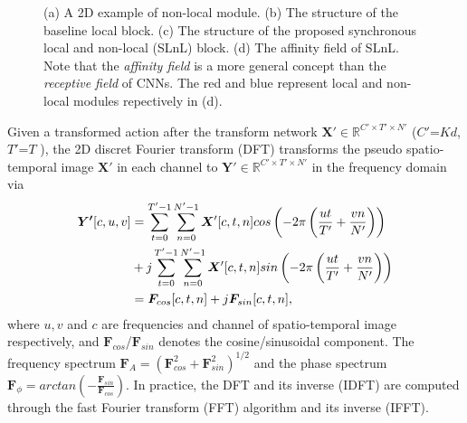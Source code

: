 \documentclass{article}
\begin{document}
\begin{figure*}[htb]
	\centering
	\caption{(a) A 2D  example of non-local module. (b) The structure of the baseline local block. (c) The structure of the proposed synchronous local and non-local (SLnL) block. (d) The affinity field of SLnL. Note that the \textit{affinity field} is a more general concept than the \textit{receptive field} of CNNs. The red and blue represent local and non-local modules repectively in (d).}
	\label{Fig3}
\end{figure*}

Given a transformed action after the transform network {\myfont$\bm{X'}\in \mathbb{R}^{C' \times T' \times N'} $} ({\myfont $C'$=$Kd$}, $T'$=$T$ ), the 2D discret Fourier transform (DFT) transforms the pseudo spatio-temporal image {\myfont$\bm{X'}$} in each channel to
{\myfont$\bm{Y'} \in \mathbb{R}^{C' \times T' \times N'} $} in the
frequency domain via
{\myfont
	\begin{align}
	\bm{Y'}[c,u,v]
& = \sum_{t=0}^{T'-1}\sum_{n=0}^{N'-1} \bm{X}'[c,t,n]cos\left(-2\pi\left(\frac{ut}{T'}+ \frac{vn}{N'}\right)\right) \notag\\
	& + j\sum_{t=0}^{T'-1}\sum_{n=0}^{N'-1} \bm{X}'[c,t,n]sin\left(-2\pi\left(\frac{ut}{T'}+ \frac{vn}{N'}\right)\right)  \notag\\
	& = \bm{F}_{cos}[c,t,n] + j \bm{F}_{sin}[c,t,n], \notag
	\end{align}
}where $u,v$ and $c$ are frequencies and channel of spatio-temporal image respectively, and {\myfont$\bm{F}_{cos}$}/{\myfont$ \bm{F}_{sin} $} denotes the cosine/sinusoidal component. The frequency spectrum {\myfont$\bm{F}_{A} = (\bm{F}_{cos}^2+ \bm{F}_{sin}^2)^{1/2}$} and the phase spectrum {\myfont$\bm{F}_{\phi} = arctan\left(-\frac{\bm{F}_{sin}}{\bm{F}_{cos}}\right) $}. In practice, the DFT and its inverse (IDFT) are computed through the fast Fourier transform (FFT) algorithm and its inverse (IFFT). 
\end{document}
